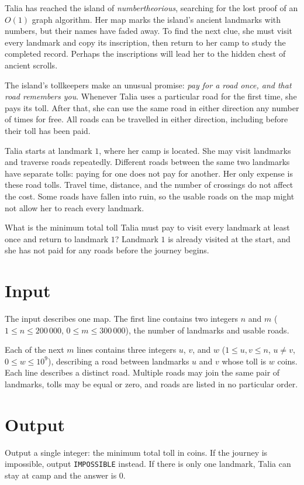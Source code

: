 
Talia has reached the island of \emph{numbertheorious}, searching for the lost
proof of an $O(1)$ graph algorithm. Her map marks the island's ancient landmarks
with numbers, but their names have faded away. To find the next clue, she must
visit every landmark and copy its inscription, then return to her camp to study
the completed record. Perhaps the inscriptions will lead her to the hidden
chest of ancient scrolls.

The island's tollkeepers make an unusual promise: \emph{pay for a road once,
and that road remembers you}. Whenever Talia uses a particular road for the
first time, she pays its toll. After that, she can use the same road in either
direction any number of times for free. All roads can be travelled in either
direction, including before their toll has been paid.

Talia starts at landmark $1$, where her camp is located. She may visit
landmarks and traverse roads repeatedly. Different roads between the same
two landmarks have separate tolls: paying for one does not pay for another.
Her only expense is these road tolls. Travel time, distance, and the number
of crossings do not affect the cost. Some roads have fallen into ruin, so
the usable roads on the map might not allow her to reach every landmark.

What is the minimum total toll Talia must pay to visit every landmark at
least once and return to landmark $1$? Landmark $1$ is already visited at
the start, and she has not paid for any roads before the journey begins.

\section*{Input}
The input describes one map. The first line contains two integers $n$ and
$m$ ($1 \leq n \leq 200\,000$, $0 \leq m \leq 300\,000$), the number of
landmarks and usable roads.

Each of the next $m$ lines contains three integers $u$, $v$, and $w$
($1 \leq u,v \leq n$, $u \neq v$, $0 \leq w \leq 10^9$), describing
a road between landmarks $u$ and $v$ whose toll is $w$ coins.
Each line describes a distinct road. Multiple roads may join the same pair
of landmarks, tolls may be equal or zero, and roads are listed in no
particular order.

\section*{Output}
Output a single integer: the minimum total toll in coins. If the journey
is impossible, output \texttt{IMPOSSIBLE} instead.
If there is only one landmark, Talia can stay at camp and the answer is $0$.

